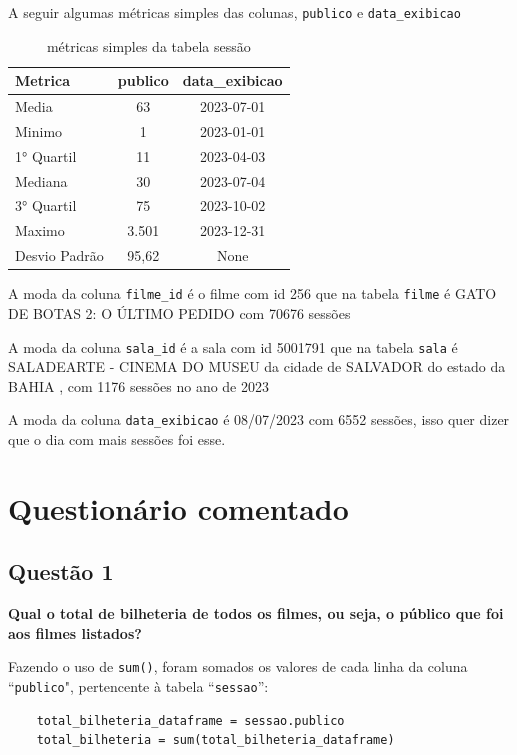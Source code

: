 \documentclass[12pt, a4paper]{article}
\begin{document}
A seguir algumas métricas simples das colunas, \texttt{publico} e \texttt{data\_exibicao}

\begin{table}[h]
    \centering
    \begin{tabular}{l|c|c}
     Metrica & publico&           data\_exibicao\\
    \hline
    Media&   63&                    2023-07-01\\
    Minimo&     1&                  2023-01-01\\
    1° Quartil &   11&                    2023-04-03\\
    Mediana&   30&                     2023-07-04\\
    3° Quartil&    75&                    2023-10-02\\
    Maximo&   3.501&                2023-12-31\\
    Desvio Padrão&    95,62&              None\\
    \end{tabular}
    \caption{métricas simples da tabela sessão}
    \label{tab:sessao_metricas}
\end{table}

A moda da coluna \texttt{filme\_id} é o filme com id 256 que na tabela \texttt{filme} é GATO DE BOTAS 2: O ÚLTIMO PEDIDO com 70676 sessões

A moda da coluna \texttt{sala\_id} é a sala com id 5001791 que na tabela \texttt{sala} é SALADEARTE - CINEMA DO MUSEU da cidade de SALVADOR do estado da BAHIA , com 1176 sessões no ano de 2023

A moda da coluna \texttt{data\_exibicao} é 08/07/2023 com 6552 sessões, isso quer dizer que o dia com mais sessões foi esse.

\section{Questionário comentado}
\subsection{Questão 1}
\textbf{Qual o total de bilheteria de todos os filmes, ou seja, o público que foi aos
filmes listados?}

Fazendo o uso de \texttt{sum()}, foram somados os valores de cada linha da coluna ``\texttt{publico}", pertencente à tabela ``\texttt{sessao}'':
\begin{verbatim}
    total_bilheteria_dataframe = sessao.publico
    total_bilheteria = sum(total_bilheteria_dataframe)
\end{verbatim}
\end{document}
